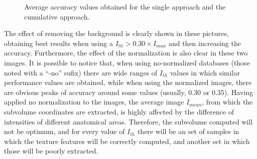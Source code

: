 \begin{figure}%
	\centering
	\caption{Average accuracy values obtained for \protect{} the single approach and \protect{} the cumulative approach.}
	\label{fig:featuresIth}
\end{figure}

The effect of removing the background is clearly shown in these pictures, obtaining best results when using a $I_{th}>0.30\times I_{max}$ and then increasing the accuracy. Furthermore, the effect of the normalization is also clear in these two images. It is possible to notice that, when using no-normalized databases (those noted with a ``-no'' sufix) there are wide ranges of $I_{th}$ values in which similar performance values are obtained, while when using the normalized images, there are obvious peaks of accuracy around some values (usually, 0.30 or 0.35). Having applied no normalization to the images, the average image $I_{mean}$, from which the subvolume coordinates are extracted, is highly affected by the difference of intensities of different anatomical areas. Therefore, the subvolume computed will not be optimum, and for every value of $I_{th}$ there will be an set of samples in which the texture features will be correctly computed, and another set in which those will be poorly extracted. 

